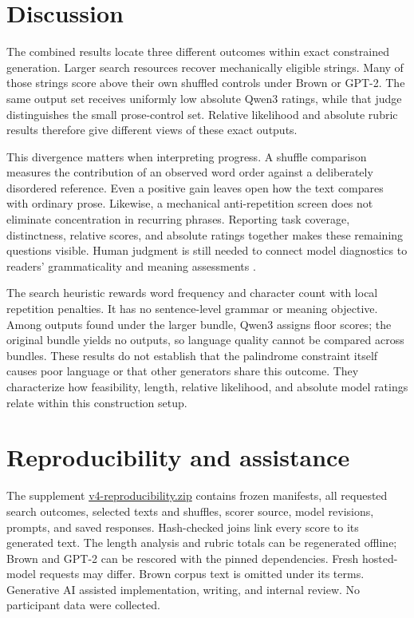 \documentclass[11pt]{article}
\begin{document}
\section{Discussion}

The combined results locate three different outcomes within exact constrained generation. Larger search resources recover mechanically eligible strings. Many of those strings score above their own shuffled controls under Brown or GPT-2. The same output set receives uniformly low absolute Qwen3 ratings, while that judge distinguishes the small prose-control set. Relative likelihood and absolute rubric results therefore give different views of these exact outputs.

This divergence matters when interpreting progress. A shuffle comparison measures the contribution of an observed word order against a deliberately disordered reference. Even a positive gain leaves open how the text compares with ordinary prose. Likewise, a mechanical anti-repetition screen does not eliminate concentration in recurring phrases. Reporting task coverage, distinctness, relative scores, and absolute ratings together makes these remaining questions visible. Human judgment is still needed to connect model diagnostics to readers' grammaticality and meaning assessments \citep{howcroft-etal-2020-twenty,khashabi-etal-2022-genie}.

The search heuristic rewards word frequency and character count with local repetition penalties. It has no sentence-level grammar or meaning objective. Among outputs found under the larger bundle, Qwen3 assigns floor scores; the original bundle yields no outputs, so language quality cannot be compared across bundles. These results do not establish that the palindrome constraint itself causes poor language or that other generators share this outcome. They characterize how feasibility, length, relative likelihood, and absolute model ratings relate within this construction setup.

\section*{Reproducibility and assistance}

The supplement \url{v4-reproducibility.zip} contains frozen manifests, all requested search outcomes, selected texts and shuffles, scorer source, model revisions, prompts, and saved responses. Hash-checked joins link every score to its generated text. The length analysis and rubric totals can be regenerated offline; Brown and GPT-2 can be rescored with the pinned dependencies. Fresh hosted-model requests may differ. Brown corpus text is omitted under its terms. Generative AI assisted implementation, writing, and internal review. No participant data were collected.
\end{document}
